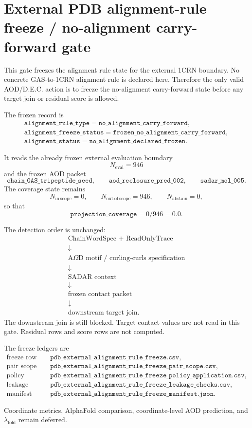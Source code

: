 \section{External PDB alignment-rule freeze / no-alignment carry-forward gate}
\label{sec:external-pdb-alignment-rule-freeze-gate}

This gate freezes the alignment rule state for the external 1CRN boundary.  No
concrete GAS-to-1CRN alignment rule is declared here.  Therefore the only valid
AOD/D.E.C. action is to freeze the no-alignment carry-forward state before any
target join or residual score is allowed.

The frozen record is
\[
\begin{gathered}
\texttt{alignment\_rule\_type}=\texttt{no\_alignment\_carry\_forward},\\
\texttt{alignment\_freeze\_status}=\texttt{frozen\_no\_alignment\_carry\_forward},\\
\texttt{alignment\_status}=\texttt{no\_alignment\_declared\_frozen}.
\end{gathered}
\]

It reads the already frozen external evaluation boundary
\[
N_{\mathrm{eval}}=946
\]
and the frozen AOD packet
\[
\texttt{chain\_GAS\_tripeptide\_seed},\qquad
\texttt{aod\_reclosure\_pred\_002},\qquad
\texttt{sadar\_mol\_005}.
\]
The coverage state remains
\[
N_{\mathrm{in\ scope}}=0,\qquad
N_{\mathrm{out\ of\ scope}}=946,\qquad
N_{\mathrm{abstain}}=0,
\]
so that
\[
\texttt{projection\_coverage}=0/946=0.0.
\]

The detection order is unchanged:
\[
\begin{array}{c}
\text{ChainWordSpec + ReadOnlyTrace}\\
\downarrow\\
\text{A$\Omega$D motif / curling-curls specification}\\
\downarrow\\
\text{SADAR context}\\
\downarrow\\
\text{frozen contact packet}\\
\downarrow\\
\text{downstream target join.}
\end{array}
\]
The downstream join is still blocked.  Target contact values are not read in this
gate.  Residual rows and score rows are not computed.

The freeze ledgers are
\[
\begin{array}{ll}
\text{freeze row} & \texttt{pdb\_external\_alignment\_rule\_freeze.csv},\\
\text{pair scope} & \texttt{pdb\_external\_alignment\_rule\_freeze\_pair\_scope.csv},\\
\text{policy} & \texttt{pdb\_external\_alignment\_rule\_freeze\_policy\_application.csv},\\
\text{leakage audit} & \texttt{pdb\_external\_alignment\_rule\_freeze\_leakage\_checks.csv},\\
\text{manifest} & \texttt{pdb\_external\_alignment\_rule\_freeze\_manifest.json}.
\end{array}
\]

Coordinate metrics, AlphaFold comparison, coordinate-level AOD prediction, and
\(\lambda_{\mathrm{fold}}\) remain deferred.
